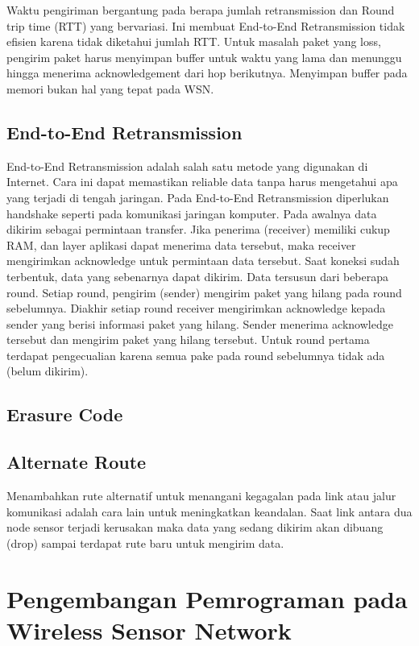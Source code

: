 Waktu pengiriman bergantung pada berapa jumlah retransmission dan Round trip time (RTT) yang bervariasi. Ini membuat End-to-End Retransmission tidak efisien karena tidak diketahui jumlah RTT. Untuk masalah paket yang loss, pengirim paket harus menyimpan buffer untuk waktu yang lama dan menunggu hingga menerima acknowledgement dari hop berikutnya. Menyimpan buffer pada memori bukan hal yang tepat pada WSN.

\subsection{End-to-End Retransmission}
End-to-End Retransmission adalah salah satu metode yang digunakan di Internet. Cara ini dapat memastikan reliable data tanpa harus mengetahui apa yang terjadi di tengah jaringan. Pada End-to-End Retransmission diperlukan handshake seperti pada komunikasi jaringan komputer. Pada awalnya data dikirim sebagai permintaan transfer. Jika penerima (receiver) memiliki cukup RAM, dan layer aplikasi dapat menerima data tersebut, maka receiver mengirimkan acknowledge untuk permintaan data tersebut. Saat koneksi sudah terbentuk, data yang sebenarnya dapat dikirim. Data tersusun dari beberapa round. Setiap round, pengirim (sender) mengirim paket yang hilang pada round sebelumnya. Diakhir setiap  round receiver mengirimkan acknowledge kepada sender yang berisi informasi paket yang hilang. Sender menerima acknowledge tersebut dan mengirim paket yang hilang tersebut. Untuk round pertama terdapat pengecualian karena semua pake pada round sebelumnya tidak ada (belum dikirim). 

\subsection{Erasure Code}

\subsection{Alternate Route}
Menambahkan rute alternatif untuk menangani kegagalan pada link atau jalur komunikasi adalah cara lain untuk meningkatkan keandalan. Saat link antara dua node sensor terjadi kerusakan maka data yang sedang dikirim akan dibuang (drop) sampai terdapat rute baru untuk mengirim data.

\section{Pengembangan Pemrograman pada Wireless Sensor Network}
\label{sec:pemrograman_wsn}


